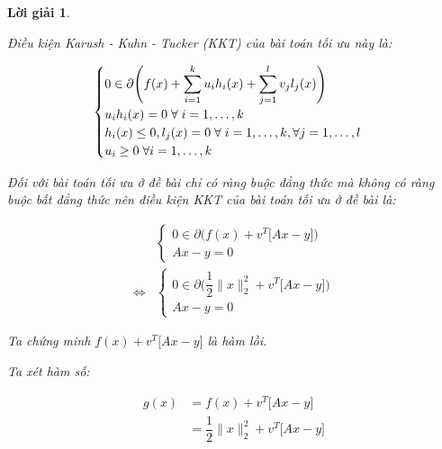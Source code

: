 \documentclass[14pt, a4paper]{article}
\theoremstyle{sltheorem}
\theoremstyle{soltheorem}
\newtheorem*{loigiai}{Lời giải}
\begin{document}
\begin{loigiai}
\begin{enumerate} [wide, labelwidth=!, labelindent=0pt,label=\textbf{\arabic*}.]
            Điều kiện Karush - Kuhn - Tucker (KKT) của bài toán tối ưu này là:

            \begin{equation*}
                \begin{cases}
                    0 \in \partial \Bigg( f(x) + \displaystyle\sum_{i=1}^k u_i h_i(x) + \displaystyle\sum_{j=1}^l v_j l_j(x) \Bigg) \\
                    u_i h_i(x) = 0 \thickspace \forall \thickspace i = 1, \dots, k \\
                    h_i(x) \leq 0, l_j(x) = 0 \thickspace \forall \thickspace i=1, \dots, k, \forall j=1, \dots, l \\
                    u_i \geq 0 \thickspace \forall i = 1, \dots, k
                \end{cases}
            \end{equation*}

            Đối với bài toán tối ưu ở đề bài chỉ có ràng buộc đẳng thức mà không có ràng buộc bất đẳng thức nên điều kiện KKT của bài toán tối ưu ở đề bài là:

            \begin{equation*}
                \begin{aligned}
                &\begin{cases}
                    0 \in \partial \Big ( f(x) + v^T\Big \lbrack Ax - y \Big \rbrack \Big) \\ Ax - y = 0
                \end{cases}\\
                \Leftrightarrow & \begin{cases} 0 \in \partial \Big( \dfrac{1}{2} \lVert x \rVert_2^2 + v^T\Big \lbrack Ax - y \Big \rbrack \Big) \\ Ax - y = 0 \end{cases}
                \end{aligned}
            \end{equation*}

            Ta chứng minh $f(x) + v^T\Big \lbrack Ax - y \Big \rbrack$ là hàm lồi.

            Ta xét hàm số:

            \begin{equation*}
                \begin{aligned}
                    g(x) &= f(x) + v^T\Big \lbrack Ax - y \Big \rbrack \\
                    &=\dfrac{1}{2} \lVert x \rVert_2^2 + v^T\Big \lbrack Ax - y \Big \rbrack
                \end{aligned}
            \end{equation*}


\end{enumerate}
\end{loigiai}
\end{document}
